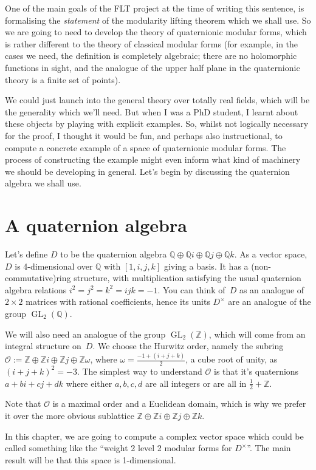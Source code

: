 \documentclass[10pt,a4paper]{article}
\newcommand{\Z}{\mathbb{Z}}
\newcommand{\Q}{\mathbb{Q}}
\newcommand{\calO}{\mathcal{O}}
\DeclareMathOperator{\GL}{GL}
\newcounter{chapter}
\begin{document}
One of the main goals of the FLT project at the time of writing this sentence, is formalising
the \emph{statement} of the modularity lifting theorem which we shall use. So we are going
to need to develop the theory of quaternionic modular forms, which is rather different
to the theory of classical modular forms (for example, in the cases we need, the definition
is completely algebraic; there are no holomorphic functions in sight, and the analogue
of the upper half plane in the quaternionic theory is a finite set of points).

We could just launch into the general theory over totally real fields, which will be the generality
which we'll need. But when I was a PhD student, I learnt about
these objects by playing with explicit examples. So, whilst not logically necessary for the proof,
I thought it would be fun, and perhaps also instructional, to compute a concrete example of a space
of quaternionic modular forms. The process of constructing the example might even inform what kind
of machinery we should be developing in general. Let's begin by discussing the quaternion algebra
we shall use.

\section{A quaternion algebra}

Let's define $D$ to be the quaternion algebra $\Q\oplus\Q i\oplus\Q j\oplus\Q k$. As a vector
space, $D$ is 4-dimensional over $\Q$ with $[1,i,j,k]$ giving a basis. It has a (non-commutative)ring structure,
with multiplication satisfying the usual quaternion algebra relations $i^2=j^2=k^2=ijk=-1$.
You can think of~$D$ as an analogue of $2\times 2$
matrices with rational coefficients, hence its units $D^\times$ are an analogue of the
group $\GL_2(\Q)$.

We will also need an analogue of the group $\GL_2(\Z)$, which will come from an integral structure
on~$D$. We choose the Hurwitz order, namely the subring $\calO:=\Z\oplus\Z i\oplus\Z j\oplus\Z \omega$,
where $\omega=\frac{-1+(i+j+k)}{2}$, a cube root of unity, as $(i+j+k)^2=-3$. The simplest way
to understand $\calO$ is that it's quaternions $a+bi+cj+dk$ where either $a,b,c,d$ are all integers
or are all in $\frac{1}{2}+\Z$.

Note that $\calO$ is a maximal order and a Euclidean domain, which is why we prefer it over the
more obvious sublattice $\Z\oplus\Z i\oplus\Z j\oplus\Z k.$

In this chapter, we are going to compute a complex vector space which could be called something
like the ``weight 2 level 2 modular forms for $D^\times$''. The main result will be that this
space is 1-dimensional.
\end{document}
